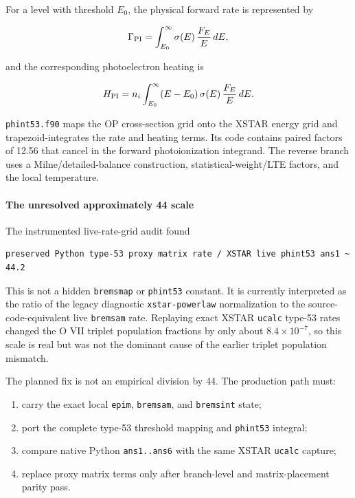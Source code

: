\documentclass[
  10pt,
]{article}
\newcommand{\passthrough}[1]{#1}
\providecommand{\tightlist}{%
  \setlength{\itemsep}{0pt}\setlength{\parskip}{0pt}}
\begin{document}
For a level with threshold \(E_0\), the physical forward rate is
represented by

\[
\Gamma_{{\rm PI}} = \int_{{E_0}}^\infty
\sigma(E)\,\frac{F_E}{E}\,dE,
\]

and the corresponding photoelectron heating is

\[
H_{{\rm PI}} = n_i\int_{{E_0}}^\infty
(E-E_0)\,\sigma(E)\,\frac{F_E}{E}\,dE.
\]

\passthrough{\lstinline!phint53.f90!} maps the OP cross-section grid
onto the XSTAR energy grid and trapezoid-integrates the rate and heating
terms. Its code contains paired factors of 12.56 that cancel in the
forward photoionization integrand. The reverse branch uses a
Milne/detailed-balance construction, statistical-weight/LTE factors, and
the local temperature.

\paragraph{The unresolved approximately 44
scale}\label{the-unresolved-approximately-44-scale}

The instrumented live-rate-grid audit found

\begin{lstlisting}
preserved Python type-53 proxy matrix rate / XSTAR live phint53 ans1 ~ 44.2
\end{lstlisting}

This is not a hidden \passthrough{\lstinline!bremsmap!} or
\passthrough{\lstinline!phint53!} constant. It is currently interpreted
as the ratio of the legacy diagnostic
\passthrough{\lstinline!xstar-powerlaw!} normalization to the
source-code-equivalent live \passthrough{\lstinline!bremsam!} rate.
Replaying exact XSTAR \passthrough{\lstinline!ucalc!} type-53 rates
changed the O VII triplet population fractions by only about
\(8.4\times10^{{-7}}\), so this scale is real but was not the dominant
cause of the earlier triplet population mismatch.

The planned fix is not an empirical division by 44. The production path
must:

\begin{enumerate}
\def\labelenumi{\arabic{enumi}.}
\tightlist
\item
  carry the exact local \passthrough{\lstinline!epim!},
  \passthrough{\lstinline!bremsam!}, and
  \passthrough{\lstinline!bremsint!} state;
\item
  port the complete type-53 threshold mapping and
  \passthrough{\lstinline!phint53!} integral;
\item
  compare native Python \passthrough{\lstinline!ans1..ans6!} with the
  same XSTAR \passthrough{\lstinline!ucalc!} capture;
\item
  replace proxy matrix terms only after branch-level and
  matrix-placement parity pass.
\end{enumerate}
\end{document}
